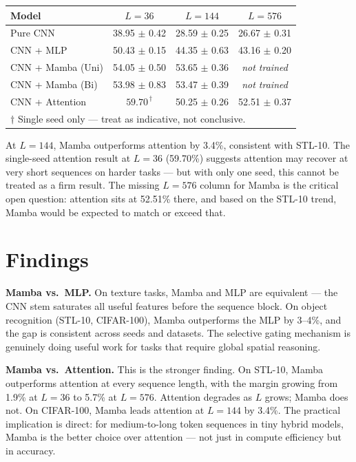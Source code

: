 \documentclass[11pt, a4paper]{article}
\begin{document}
\begin{center}
\begin{tabular}{lccc}
\toprule
\textbf{Model} & $L=36$ & $L=144$ & $L=576$ \\
\midrule
Pure CNN          & 38.95 $\pm$ 0.42 & 28.59 $\pm$ 0.25 & 26.67 $\pm$ 0.31 \\
CNN + MLP         & 50.43 $\pm$ 0.15 & 44.35 $\pm$ 0.63 & 43.16 $\pm$ 0.20 \\
CNN + Mamba (Uni) & 54.05 $\pm$ 0.50 & 53.65 $\pm$ 0.36 & \textit{not trained} \\
CNN + Mamba (Bi)  & 53.98 $\pm$ 0.83 & 53.47 $\pm$ 0.39 & \textit{not trained} \\
CNN + Attention   & $59.70^{\,\dagger}$ & 50.25 $\pm$ 0.26 & 52.51 $\pm$ 0.37 \\
\bottomrule
\multicolumn{4}{l}{\footnotesize $\dagger$ Single seed only — treat as indicative, not conclusive.}
\end{tabular}
\end{center}

At $L=144$, Mamba outperforms attention by 3.4\%, consistent with STL-10.
The single-seed attention result at $L=36$ (59.70\%) suggests attention may recover
at very short sequences on harder tasks — but with only one seed, this cannot be
treated as a firm result. The missing $L=576$ column for Mamba is the critical open
question: attention sits at 52.51\% there, and based on the STL-10 trend, Mamba
would be expected to match or exceed that.

\section{Findings}

\textbf{Mamba vs.\ MLP.} On texture tasks, Mamba and MLP are equivalent —
the CNN stem saturates all useful features before the sequence block.
On object recognition (STL-10, CIFAR-100), Mamba outperforms the MLP by 3--4\%,
and the gap is consistent across seeds and datasets. The selective gating mechanism
is genuinely doing useful work for tasks that require global spatial reasoning.

\textbf{Mamba vs.\ Attention.} This is the stronger finding.
On STL-10, Mamba outperforms attention at every sequence length, with the margin
growing from 1.9\% at $L=36$ to 5.7\% at $L=576$. Attention degrades as $L$ grows;
Mamba does not. On CIFAR-100, Mamba leads attention at $L=144$ by 3.4\%.
The practical implication is direct: for medium-to-long token sequences in tiny
hybrid models, Mamba is the better choice over attention — not just in compute
efficiency but in accuracy.
\end{document}
